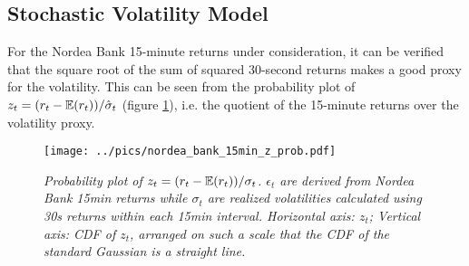 \subsection{Stochastic Volatility Model}\label{sec:nordea_15min_arima}
For the Nordea Bank 15-minute returns under consideration, it can be
verified that the square root of the sum of squared 30-second returns
makes a good proxy for the volatility. This can be seen from the
probability plot of $z_t = (r_t - \mathbb{E}(r_t))/\hat{\sigma}_t$ (figure
\ref{fig:nordea_bank_15min_z_prob}), i.e. the quotient of the 
15-minute returns over the volatility proxy.
\begin{figure}[htb!]
  \centering
    \texttt{[image: ../pics/nordea\_bank\_15min\_z\_prob.pdf]}
  \caption{\small \it Probability plot of $z_t =
    (r_t-\mathbb{E}(r_t))/\sigma_t$. $\epsilon_t$ are derived 
      from Nordea Bank 15min returns while $\sigma_t$ are realized
      volatilities calculated using 30s returns within each 15min
      interval. Horizontal axis: $z_t$; Vertical axis: CDF of
    $z_t$, arranged on such a scale that the CDF of the standard
    Gaussian is a straight line.}
  \label{fig:nordea_bank_15min_z_prob}
\end{figure}

